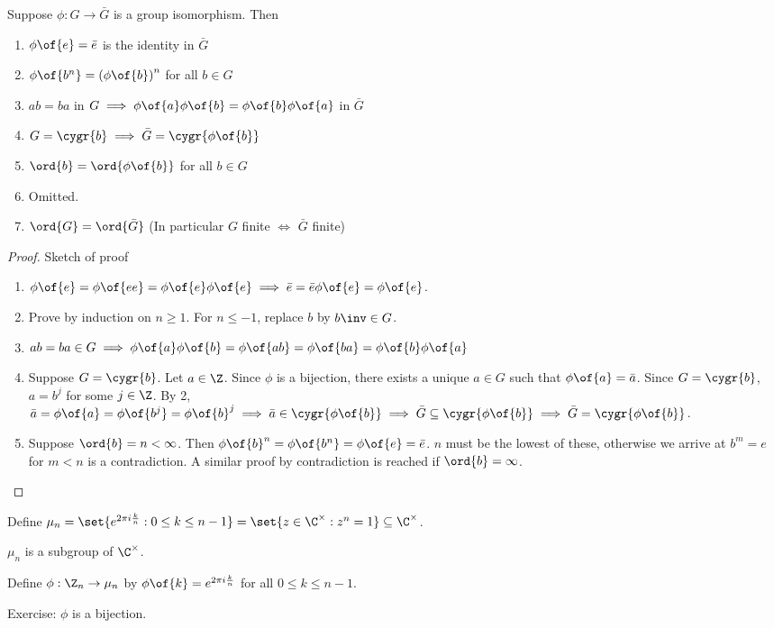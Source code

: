 \begin{theorem}
    Suppose $\phi: G \to \bar{G}$ is a group isomorphism. Then 
    \begin{enumerate}
        \item $\phi\of{e} = \bar{e}$ is the identity in $\bar{G}$
        \item $\phi\of{b^n} = \left(\phi\of{b}\right)^n$ for all $b \in G$
        \item $ab = ba$ in $G \implies \phi\of{a} \phi\of{b} = \phi\of{b} \phi\of{a}$ in $\bar{G}$
        \item $G = \cygr{b} \implies \bar{G} = \cygr{\phi\of{b}}$
        \item $\ord{b} = \ord{\phi\of{b}}$ for all $b \in G$
        \item Omitted.
        \item $\ord{G} = \ord{\bar{G}}$ (In particular $G$ finite $\iff$ $\bar{G}$ finite)
    \end{enumerate}
\end{theorem}
\begin{proof}
    Sketch of proof\begin{enumerate}
        \item $\phi\of{e} = \phi\of{ee} = \phi\of{e} \phi\of{e} \implies \bar{e} = \bar{e}\phi\of{e} = \phi\of{e}$.
        \item Prove by induction on $n \geq 1$. For $n \leq -1$, replace $b$ by $b\inv \in G$.
        \item $ab = ba \in G \implies \phi\of{a} \phi\of{b} = \phi\of{ab} = \phi\of{ba} = \phi\of{b} \phi\of{a}$
        \item Suppose $G = \cygr{b}$. Let $a \in \Z$. Since $\phi$ is a bijection, there exists a unique $a \in G$ such that $\phi\of{a} = \bar{a}$. Since $G = \cygr{b}$, $a = b^j$ for some $j \in \Z$. By 2, $\bar{a} = \phi\of{a} = \phi\of{b^j} = \phi\of{b}^j \implies \bar{a} \in \cygr{\phi\of{b}} \implies \bar{G} \subseteq \cygr{\phi\of{b}} \implies \bar{G} = \cygr{\phi\of{b}}$.
        \item Suppose $\ord{b} = n < \infty$. Then $\phi\of{b}^n = \phi\of{b^n} = \phi\of{e} = \bar{e}$. $n$ must be the lowest of these, otherwise we arrive at $b^m = e$ for $m < n$ is a contradiction. A similar proof by contradiction is reached if $\ord{b} = \infty$.
    \end{enumerate}
\end{proof}

\begin{example}
    Define $\mu_n = \set{e^{2\pi i \frac{k}{n}}: 0 \leq k \leq n - 1} = \set{z \in \C^\times: z^n = 1} \subseteq \C^\times$.

    $\mu_n$ is a subgroup of $\C^\times$.

    Define $\phi: \Z_n \to \mu_n$ by $\phi\of{k} = e^{2\pi i \frac{k}{n}}$ for all $0 \leq k \leq n - 1$.
    
    Exercise: $\phi$ is a bijection.
\end{example}